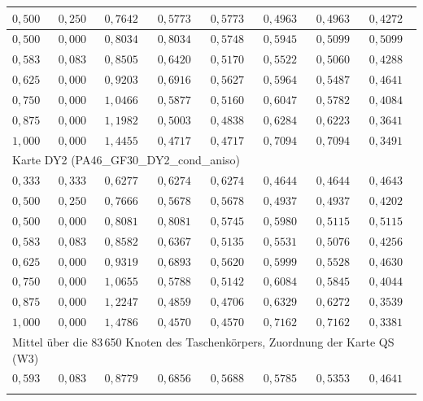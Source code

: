 \begin{table}[htbp]
\begin{tabular}{llllllll}
        \hline
        $0{,}500$ & $0{,}250$ & $0{,}7642$ & $0{,}5773$ & $0{,}5773$ & $0{,}4963$ & $0{,}4963$ & $0{,}4272$ \\
        \hline
        $0{,}500$ & $0{,}000$ & $0{,}8034$ & $0{,}8034$ & $0{,}5748$ & $0{,}5945$ & $0{,}5099$ & $0{,}5099$ \\
        \hline
        $0{,}583$ & $0{,}083$ & $0{,}8505$ & $0{,}6420$ & $0{,}5170$ & $0{,}5522$ & $0{,}5060$ & $0{,}4288$ \\
        \hline
        $0{,}625$ & $0{,}000$ & $0{,}9203$ & $0{,}6916$ & $0{,}5627$ & $0{,}5964$ & $0{,}5487$ & $0{,}4641$ \\
        \hline
        $0{,}750$ & $0{,}000$ & $1{,}0466$ & $0{,}5877$ & $0{,}5160$ & $0{,}6047$ & $0{,}5782$ & $0{,}4084$ \\
        \hline
        $0{,}875$ & $0{,}000$ & $1{,}1982$ & $0{,}5003$ & $0{,}4838$ & $0{,}6284$ & $0{,}6223$ & $0{,}3641$ \\
        \hline
        $1{,}000$ & $0{,}000$ & $1{,}4455$ & $0{,}4717$ & $0{,}4717$ & $0{,}7094$ & $0{,}7094$ & $0{,}3491$ \\
        \hline
        \multicolumn{8}{l}{Karte DY2 (PA46\_GF30\_DY2\_cond\_aniso)} \\
        \hline
        $0{,}333$ & $0{,}333$ & $0{,}6277$ & $0{,}6274$ & $0{,}6274$ & $0{,}4644$ & $0{,}4644$ & $0{,}4643$ \\
        \hline
        $0{,}500$ & $0{,}250$ & $0{,}7666$ & $0{,}5678$ & $0{,}5678$ & $0{,}4937$ & $0{,}4937$ & $0{,}4202$ \\
        \hline
        $0{,}500$ & $0{,}000$ & $0{,}8081$ & $0{,}8081$ & $0{,}5745$ & $0{,}5980$ & $0{,}5115$ & $0{,}5115$ \\
        \hline
        $0{,}583$ & $0{,}083$ & $0{,}8582$ & $0{,}6367$ & $0{,}5135$ & $0{,}5531$ & $0{,}5076$ & $0{,}4256$ \\
        \hline
        $0{,}625$ & $0{,}000$ & $0{,}9319$ & $0{,}6893$ & $0{,}5620$ & $0{,}5999$ & $0{,}5528$ & $0{,}4630$ \\
        \hline
        $0{,}750$ & $0{,}000$ & $1{,}0655$ & $0{,}5788$ & $0{,}5142$ & $0{,}6084$ & $0{,}5845$ & $0{,}4044$ \\
        \hline
        $0{,}875$ & $0{,}000$ & $1{,}2247$ & $0{,}4859$ & $0{,}4706$ & $0{,}6329$ & $0{,}6272$ & $0{,}3539$ \\
        \hline
        $1{,}000$ & $0{,}000$ & $1{,}4786$ & $0{,}4570$ & $0{,}4570$ & $0{,}7162$ & $0{,}7162$ & $0{,}3381$ \\
        \hline
        \multicolumn{8}{l}{Mittel über die 83\,650 Knoten des Taschenkörpers, Zuordnung der Karte QS (W3)} \\
        \hline
        $0{,}593$ & $0{,}083$ & $0{,}8779$ & $0{,}6856$ & $0{,}5688$ & $0{,}5785$ & $0{,}5353$ & $0{,}4641$ \\
        \hline
        \arrayrulecolor{black}
    \end{tabular}
\end{table}
